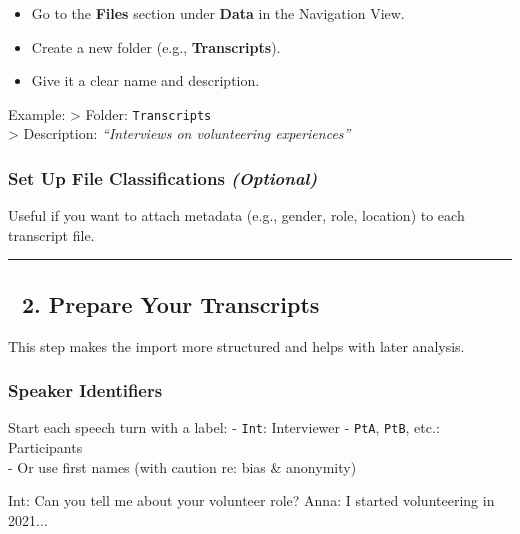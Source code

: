 \documentclass[
  letterpaper,
  DIV=11,
  numbers=noendperiod]{scrreprt}
\newenvironment{Shaded}{\begin{snugshade}}{\end{snugshade}}
\newcommand{\NormalTok}[1]{\textcolor[rgb]{0.00,0.23,0.31}{#1}}
\providecommand{\tightlist}{%
  \setlength{\itemsep}{0pt}\setlength{\parskip}{0pt}}\usepackage{longtable,booktabs,array}
\begin{document}
\begin{itemize}
\tightlist
\item
  Go to the \textbf{Files} section under \textbf{Data} in the Navigation
  View.
\item
  Create a new folder (e.g., \textbf{Transcripts}).
\item
  Give it a clear name and description.
\end{itemize}

Example: \textgreater{} Folder: \texttt{Transcripts}\\
\textgreater{} Description: \emph{``Interviews on volunteering
experiences''}

\subsubsection{\texorpdfstring{Set Up File Classifications
\emph{(Optional)}}{Set Up File Classifications (Optional)}}\label{set-up-file-classifications-optional}

Useful if you want to attach metadata (e.g., gender, role, location) to
each transcript file.

\begin{center}\rule{0.5\linewidth}{0.5pt}\end{center}

\subsection{📝 2. Prepare Your
Transcripts}\label{prepare-your-transcripts}

This step makes the import more structured and helps with later
analysis.

\subsubsection{Speaker Identifiers}\label{speaker-identifiers}

Start each speech turn with a label: - \texttt{Int}: Interviewer -
\texttt{PtA}, \texttt{PtB}, etc.: Participants\\
- Or use first names (with caution re: bias \& anonymity)

\begin{Shaded}
\begin{Highlighting}[]
\NormalTok{Int: Can you tell me about your volunteer role?}
\NormalTok{Anna: I started volunteering in 2021...}
\end{Highlighting}
\end{Shaded}
\end{document}
